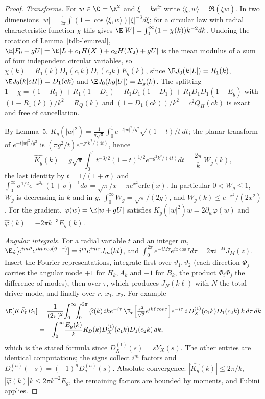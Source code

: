 \begin{proof}
\emph{Transforms.} For $w\in\C=\R^2$ and $\xi=ke^{i\tau}$ write $\langle\xi,w\rangle=\Re(\bar\xi w)$. In two dimensions
$|w|=\frac1{2\pi}\int(1-\cos\langle\xi,w\rangle)|\xi|^{-3}d\xi$; for a circular law with radial characteristic function $\chi$ this gives
$\E|W|=\int_0^\infty(1-\chi(k))k^{-2}dk$. Undoing the rotation of Lemma~\ref{tdb-lem:real}, $\E|F_0+gU|=\E|L+c_1H(X_1)+c_2H(X_2)+gU|$ is the
mean modulus of a sum of four independent circular variables, so $\chi(k)=R_1(k)D_1(c_1k)D_1(c_2k)E_g(k)$, since $\E J_0(k|L|)=R_1(k)$,
$\E J_0(k|cH|)=D_1(ck)$ and $\E J_0(kg|U|)=E_g(k)$. The splitting
$1-\chi=(1-R_1)+R_1(1-D_1)+R_1D_1(1-D_1)+R_1D_1D_1(1-E_g)$ with $(1-R_1(k))/k^2=R_Q(k)$ and $(1-D_1(ck))/k^2=c^2Q_H(ck)$ is exact and free of
cancellation.

By Lemma~5, $K_g(|w|^2)=\frac1{g\sqrt\pi}\int_0^1e^{-t|w|^2/g^2}\sqrt{(1-t)/t}\,dt$; the planar transform of $e^{-t|w|^2/g^2}$ is
$(\pi g^2/t)e^{-g^2k^2/(4t)}$, hence
\[
\widehat{K_g}(k)=g\sqrt\pi\int_0^1t^{-3/2}(1-t)^{1/2}e^{-g^2k^2/(4t)}dt=\frac{2\pi}{k}\,W_g(k),
\]
the last identity by $t=1/(1+\sigma)$ and $\int_0^\infty\sigma^{1/2}e^{-x^2\sigma}(1+\sigma)^{-1}d\sigma=\sqrt\pi/x-\pi e^{x^2}\mathrm{erfc}(x)$.
In particular $0<W_g\le1$, $W_g$ is decreasing in $k$ and in $g$, $\int_0^\infty W_g=\sqrt\pi/(2g)$, and $W_g(k)\le e^{-x^2}/(2x^2)$.
For the gradient, $\varphi(w)=\E|w+gU|$ satisfies $K_g(|w|^2)\bar w=2\partial_w\varphi(w)$ and $\widehat\varphi(k)=-2\pi k^{-3}E_g(k)$.

\emph{Angular integrals.} For a radial variable $t$ and an integer $m$, $\E_\vartheta[e^{im\vartheta}e^{ikt\cos(\vartheta-\tau)}]=i^me^{im\tau}J_m(kt)$,
and $\int_0^{2\pi}e^{-iM\tau}e^{iz\cos\tau}d\tau=2\pi i^{-M}J_M(z)$. Insert the Fourier representations, integrate first over $\vartheta_1,\vartheta_2$
(each direction $\Phi_j$ carries the angular mode $+1$ for $H_k,A_k$ and $-1$ for $B_k$, the product $\bar\Phi_i\Phi_j$ the difference of
modes), then over $\tau$, which produces $J_N(k\ell)$ with $N$ the total driver mode, and finally over $r$, $x_1$, $x_2$. For example
\begin{align*}
\E[K\bar F_0B_1]&=\frac1{(2\pi)^2}\!\int_0^\infty\!\!\int_0^{2\pi}\widehat\varphi(k)\,ike^{-i\tau}\,\E_r\Bigl[\tfrac{r^2}{\sqrt2}e^{ik\ell\cos\tau}\Bigr]e^{-i\tau}\,i\,D^{(1)}_X(c_1k)D_1(c_2k)\,k\,d\tau\,dk\\
&=-\!\int_0^\infty\!\frac{E_g(k)}{k}R_B(k)D^{(1)}_X(c_1k)D_1(c_2k)\,dk,
\end{align*}
which is the stated formula since $D^{(1)}_X(s)=sY_X(s)$. The other entries are identical computations; the signs collect $i^m$ factors
and $D^{(n)}_q(-s)=(-1)^nD^{(n)}_q(s)$. Absolute convergence: $|\widehat{K_g}(k)|\le2\pi/k$, $|\widehat\varphi(k)|k\le2\pi k^{-2}E_g$, the remaining
factors are bounded by moments, and Fubini applies.
\end{proof}


